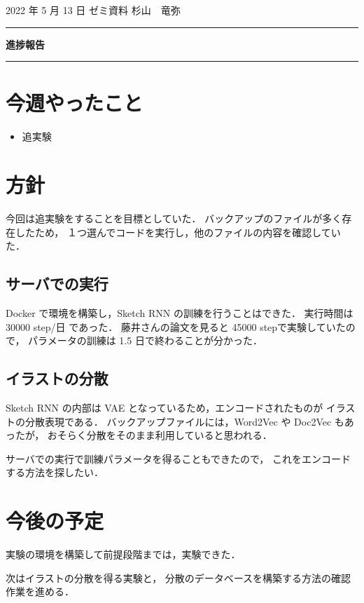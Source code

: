 \documentclass[onecolumn]{ujarticle}   %
\begin{document}

		\noindent
		\hspace{1em}
		2022 年 5 月 13 日
		ゼミ資料
		\hfill
		杉山　竜弥
		\vspace{2mm}

		\hrule
		\begin{center}
			{\Large \bf 進捗報告}
		\end{center}
		\hrule
		\vspace{9mm}


\section{今週やったこと}
\begin{itemize}
  \item 追実験
\end{itemize}

\section{方針}
今回は追実験をすることを目標としていた．
バックアップのファイルが多く存在したため，
１つ選んでコードを実行し，他のファイルの内容を確認していた．

\subsection{サーバでの実行}
Docker で環境を構築し，Sketch RNN の訓練を行うことはできた．
実行時間は 30000 step/日 であった．
藤井さんの論文を見ると 45000 stepで実験していたので，
パラメータの訓練は 1.5 日で終わることが分かった．


\subsection{イラストの分散}
Sketch RNN の内部は VAE となっているため，エンコードされたものが
イラストの分散表現である．
バックアップファイルには，Word2Vec や Doc2Vec もあったが，
おそらく分散をそのまま利用していると思われる．


サーバでの実行で訓練パラメータを得ることもできたので，
これをエンコードする方法を探したい．

\section{今後の予定}
実験の環境を構築して前提段階までは，実験できた．

次はイラストの分散を得る実験と，
分散のデータベースを構築する方法の確認作業を進める．

% 
% 
\end{document}
